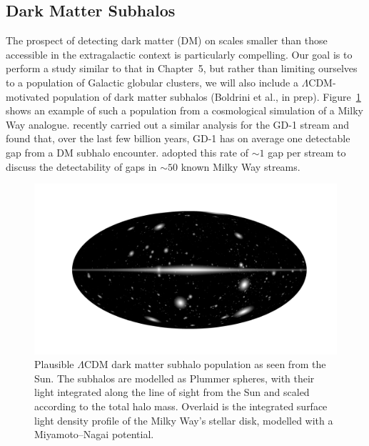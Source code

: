     \subsection{Dark Matter Subhalos}
        The prospect of detecting dark matter (DM) on scales smaller than those accessible in the extragalactic context is particularly compelling. Our goal is to perform a study similar to that in Chapter~5, but rather than limiting ourselves to a population of Galactic globular clusters, we will also include a $\Lambda$CDM-motivated population of dark matter subhalos (Boldrini et al., in prep). Figure~\ref{fig:mollweide-density-with-haloes.png} shows an example of such a population from a cosmological simulation of a Milky Way analogue. \citet{2024arXiv241213144A} recently carried out a similar analysis for the GD-1 stream and found that, over the last few billion years, GD-1 has on average one detectable gap from a DM subhalo encounter. \citet{2025arXiv250207781L} adopted this rate of $\sim1$ gap per stream to discuss the detectability of gaps in $\sim 50$ known Milky Way streams.

        \begin{figure}
            \includegraphics[width=\linewidth]{images/mollweide-density-with-haloes.png}
            \caption[Plausible $\Lambda$CDM dark matter subhalo population as seen from the Sun]{Plausible $\Lambda$CDM dark matter subhalo population as seen from the Sun. The subhalos are modelled as Plummer spheres, with their light integrated along the line of sight from the Sun and scaled according to the total halo mass. Overlaid is the integrated surface light density profile of the Milky Way's stellar disk, modelled with a Miyamoto--Nagai potential. }
            \label{fig:mollweide-density-with-haloes.png}
        \end{figure}


